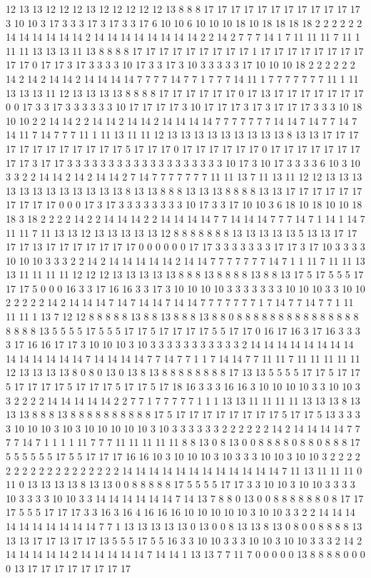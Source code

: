 12 13 13 12 12 12 13 12 12 12 12 12 13 8 8 8 17 17 17 17 17 17 17 17 17 17 17 17 3 10 10 3 17 3 3 3 17 3 17 3 3 17 6 10 10 6 10 10 10 18 10 18 18 18 18 2 2 2 2 2 2 14 14 14 14 14 14 2 14 14 14 14 14 14 14 14 2 2 14 2 7 7 7 14 1 7 11 11 11 7 11 1 11 11 13 13 13 11 13 8 8 8 8 17 17 17 17 17 17 17 17 17 1 17 17 17 17 17 17 17 17 17 17 0 17 17 3 17 3 3 3 3 10 17 3 3 17 3 10 3 3 3 3 3 17 10 10 10 18 2 2 2 2 2 2 14 2 14 2 14 14 2 14 14 14 14 7 7 7 7 14 7 7 1 7 7 7 14 11 1 7 7 7 7 7 7 7 11 1 11 13 13 13 11 12 13 13 13 13 8 8 8 8 17 17 17 17 17 17 0 17 13 17 17 17 17 17 17 17 0 0 17 3 3 17 3 3 3 3 3 3 10 17 17 17 17 3 10 17 17 17 3 17 3 17 17 17 3 3 3 10 18 10 10 2 2 14 14 2 2 14 14 2 14 14 2 14 14 14 14 7 7 7 7 7 7 7 14 14 7 14 7 7 14 7 14 11 7 14 7 7 7 11 1 11 13 11 11 12 13 13 13 13 13 13 13 13 13 8 13 13 17 17 17 17 17 17 17 17 17 17 17 17 5 17 17 17 0 17 17 17 17 17 17 0 17 17 17 17 17 17 17 17 17 3 17 17 3 3 3 3 3 3 3 3 3 3 3 3 3 3 3 3 3 3 3 10 17 3 10 17 3 3 3 3 6 10 3 10 3 3 2 2 14 14 2 14 2 14 14 2 7 14 7 7 7 7 7 7 7 11 11 13 7 11 13 11 12 12 13 13 13 13 13 13 13 13 13 13 13 13 8 13 13 8 8 8 13 13 13 8 8 8 8 13 13 17 17 17 17 17 17 17 17 17 17 0 0 0 17 3 17 3 3 3 3 3 3 3 3 10 17 3 3 17 10 10 3 6 18 10 18 10 10 18 18 3 18 2 2 2 2 14 2 2 14 14 14 2 2 14 14 14 14 7 7 14 14 14 7 7 7 14 7 1 14 1 14 7 11 11 7 11 13 13 12 13 13 13 13 13 12 8 8 8 8 8 8 8 13 13 13 13 13 5 13 13 17 17 17 17 13 17 17 17 17 17 17 17 0 0 0 0 0 0 17 17 3 3 3 3 3 3 3 17 17 3 17 10 3 3 3 3 10 10 10 3 3 3 2 2 14 2 14 14 14 14 14 2 14 14 7 7 7 7 7 7 7 14 7 1 1 11 7 11 11 13 13 11 11 11 11 12 12 12 13 13 13 13 13 8 8 8 13 8 8 8 8 13 8 8 13 17 5 17 5 5 5 17 17 17 5 0 0 0 16 3 3 17 16 16 3 3 17 3 10 10 10 10 3 3 3 3 3 3 3 10 10 10 3 3 10 10 2 2 2 2 2 14 2 14 14 14 7 14 7 14 14 7 14 14 7 7 7 7 7 7 7 1 7 14 7 7 14 7 7 1 11 11 11 1 13 7 12 12 8 8 8 8 8 13 8 8 13 8 8 8 13 8 8 0 8 8 8 8 8 8 8 8 8 8 8 8 8 8 8 8 8 8 8 13 5 5 5 5 17 5 5 5 17 17 5 17 17 17 17 5 5 17 17 0 16 17 16 3 17 16 3 3 3 3 17 16 16 17 17 3 10 10 10 3 10 3 3 3 3 3 3 3 3 3 3 3 2 14 14 14 14 14 14 14 14 14 14 14 14 14 14 7 14 14 14 14 7 7 14 7 7 1 1 7 14 14 7 7 11 11 7 11 11 11 11 11 12 13 13 13 13 8 0 8 0 13 0 13 8 13 8 8 8 8 8 8 8 8 17 13 13 5 5 5 5 17 17 5 17 17 5 17 17 17 17 5 17 17 17 5 17 17 5 17 18 16 3 3 3 16 16 3 10 10 10 10 3 3 10 10 3 3 2 2 2 2 14 14 14 14 14 2 2 7 7 1 7 7 7 7 7 1 1 1 13 13 11 11 11 11 13 13 13 8 13 13 13 8 8 8 13 8 8 8 8 8 8 8 8 8 8 17 5 17 17 17 17 17 17 17 17 5 17 17 5 13 3 3 3 3 10 10 10 3 10 3 10 10 10 10 10 3 10 3 3 3 3 3 3 2 2 2 2 2 2 14 2 14 14 14 14 7 7 7 7 14 7 1 1 1 1 11 7 7 7 11 11 11 11 11 8 8 13 0 8 13 0 0 8 8 8 8 0 8 8 0 8 8 8 17 5 5 5 5 5 5 17 5 5 17 17 17 16 16 10 3 10 10 10 3 10 3 3 3 10 10 3 10 10 3 2 2 2 2 2 2 2 2 2 2 2 2 2 2 2 2 2 2 14 14 14 14 14 14 14 14 14 14 14 14 7 11 13 11 11 11 0 11 0 13 13 13 13 8 13 13 0 0 8 8 8 8 8 17 5 5 5 5 17 17 3 3 10 10 3 10 10 3 3 3 3 10 3 3 3 3 10 10 3 3 14 14 14 14 14 14 7 14 13 7 8 8 0 13 0 0 8 8 8 8 8 8 0 8 17 17 17 5 5 5 17 17 17 3 3 16 3 16 4 16 16 16 10 10 10 10 10 3 10 10 3 3 2 2 14 14 14 14 14 14 14 14 14 14 7 7 1 13 13 13 13 13 0 13 0 0 8 13 13 8 13 0 8 0 0 8 8 8 8 13 13 13 17 17 13 17 17 13 5 5 5 17 5 5 16 3 3 10 10 3 3 3 10 10 3 10 10 3 3 3 2 14 2 14 14 14 14 14 2 14 14 14 14 14 7 14 14 1 13 13 7 7 11 7 0 0 0 0 0 13 8 8 8 8 0 0 0 0 13 17 17 17 17 17 17 17 17 